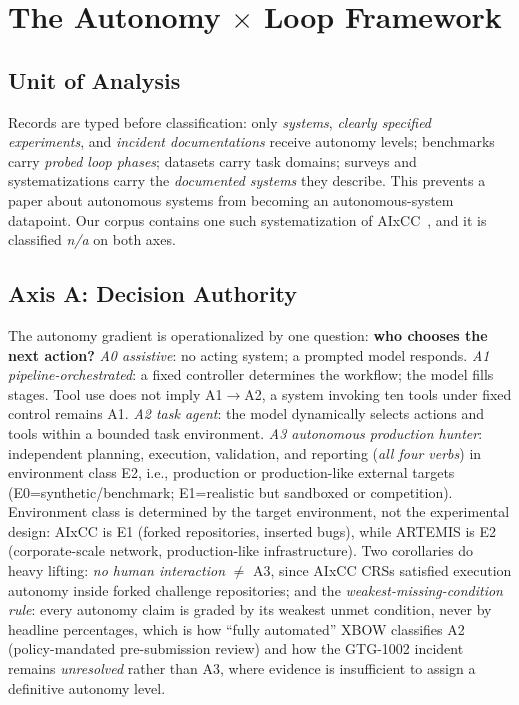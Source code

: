 \documentclass[conference,compsoc]{IEEEtran}
\begin{document}
\section{The Autonomy $\times$ Loop Framework}
\label{sec:framework}

\subsection{Unit of Analysis}
Records are typed before classification: only \emph{systems}, \emph{clearly specified
experiments}, and \emph{incident documentations} receive autonomy levels; benchmarks carry
\emph{probed loop phases}; datasets carry task domains; surveys and systematizations carry the
\emph{documented systems} they describe. This prevents a paper about autonomous systems from
becoming an autonomous-system datapoint. Our corpus contains one such systematization of
AIxCC~\cite{r7sokaixcc2026}, and it is classified \emph{n/a} on both axes.

\subsection{Axis A: Decision Authority}
The autonomy gradient is operationalized by one question: \textbf{who chooses the next action?}
\emph{A0 assistive}: no acting system; a prompted model responds. \emph{A1
pipeline-orchestrated}: a fixed controller determines the workflow; the model fills stages.
Tool use does not imply A1$\rightarrow$A2, a system invoking ten tools under fixed control
remains A1. \emph{A2 task agent}: the model dynamically selects actions and tools within a
bounded task environment. \emph{A3 autonomous production hunter}: independent planning,
execution, validation, and reporting (\emph{all four verbs}) in environment class E2, i.e., 
production or production-like external targets (E0=synthetic/benchmark; E1=realistic but
sandboxed or competition). Environment class is determined by the target environment, not the
experimental design: AIxCC is E1 (forked repositories, inserted bugs), while ARTEMIS is E2
(corporate-scale network, production-like infrastructure). Two corollaries do heavy lifting:
\emph{no human interaction} $\neq$ A3, since AIxCC CRSs satisfied execution autonomy inside
forked challenge repositories; and the \emph{weakest-missing-condition rule}: every autonomy
claim is graded by its weakest unmet condition, never by headline percentages, which is how
``fully automated'' XBOW classifies A2 (policy-mandated pre-submission review) and how the
GTG-1002 incident remains \emph{unresolved} rather than A3, where evidence is insufficient
to assign a definitive autonomy level.
\end{document}
